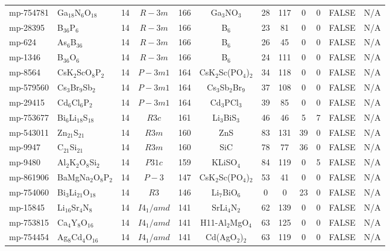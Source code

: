 {\begin{longtable}{llcccccccccc}
    mp-754781 & Ga$_{18}$N$_{6}$O$_{18}$ & 14    & $R-3m$ & 166   & Ga$_{3}$NO$_{3}$ & 28    & 117   & 0     & 0     & FALSE & N/A \\
    mp-28395 & B$_{36}$P$_{6}$ & 14    & $R-3m$ & 166   & B$_{6}$ & 23    & 81    & 0     & 0     & FALSE & N/A \\
    mp-624 & As$_{6}$B$_{36}$ & 14    & $R-3m$ & 166   & B$_{6}$ & 26    & 45    & 0     & 0     & FALSE & N/A \\
    mp-1346 & B$_{36}$O$_{6}$ & 14    & $R-3m$ & 166   & B$_{6}$ & 24    & 111   & 0     & 0     & FALSE & N/A \\
    mp-8564 & CsK$_{2}$ScO$_{8}$P$_{2}$ & 14    & $P-3m1$ & 164   & CsK$_{2}$Sc(PO$_{4}$)$_{2}$ & 34    & 118   & 0     & 0     & FALSE & N/A \\
    mp-579560 & Cs$_{3}$Br$_{9}$Sb$_{2}$ & 14    & $P-3m1$ & 164   & Cs$_{3}$Sb$_{2}$Br$_{9}$ & 37    & 108   & 0     & 0     & FALSE & N/A \\
    mp-29415 & Cd$_{6}$Cl$_{6}$P$_{2}$ & 14    & $P-3m1$ & 164   & Cd$_{3}$PCl$_{3}$ & 39    & 85    & 0     & 0     & FALSE & N/A \\
    mp-753677 & Bi$_{6}$Li$_{18}$S$_{18}$ & 14    & $R3c$ & 161   & Li$_{3}$BiS$_{3}$ & 46    & 46    & 5     & 7     & FALSE & N/A \\
    mp-543011 & Zn$_{21}$S$_{21}$ & 14    & $R3m$ & 160   & ZnS   & 83    & 131   & 39    & 0     & FALSE & N/A \\
    mp-9947 & C$_{21}$Si$_{21}$ & 14    & $R3m$ & 160   & SiC   & 78    & 77    & 36    & 0     & FALSE & N/A \\
    mp-9480 & Al$_{2}$K$_{2}$O$_{8}$Si$_{2}$ & 14    & $P31c$ & 159   & KLiSO$_{4}$ & 84    & 119   & 0     & 5     & FALSE & N/A \\
    mp-861906 & BaMgNa$_{2}$O$_{8}$P$_{2}$ & 14    & $P-3$ & 147   & CsK$_{2}$Sc(PO$_{4}$)$_{2}$ & 53    & 41    & 0     & 0     & FALSE & N/A \\
    mp-754060 & Bi$_{3}$Li$_{21}$O$_{18}$ & 14    & $R3$  & 146   & Li$_{7}$BiO$_{6}$ & 0     & 0     & 23    & 0     & FALSE & N/A \\
    mp-15845 & Li$_{16}$Sr$_{4}$N$_{8}$ & 14    & $I4_1/amd$ & 141   & SrLi$_{4}$N$_{2}$ & 62    & 139   & 0     & 0     & FALSE & N/A \\
    mp-753815 & Ca$_{4}$Y$_{8}$O$_{16}$ & 14    & $I4_1/amd$ & 141   & H11-Al$_{2}$MgO$_{4}$ & 63    & 125   & 0     & 0     & FALSE & N/A \\
    mp-754454 & Ag$_{8}$Cd$_{4}$O$_{16}$ & 14    & $I4_1/amd$ & 141   & Cd(AgO$_{2}$)$_{2}$ & 63    & 119   & 0     & 0     & FALSE & N/A \\

\end{longtable}}
